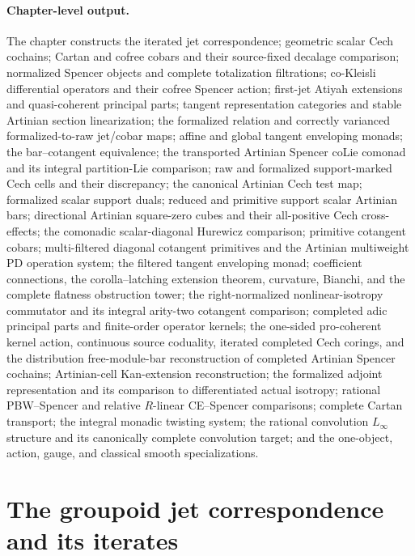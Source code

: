 \paragraph{Chapter-level output.}
The chapter constructs the iterated jet correspondence; geometric scalar
Cech cochains; Cartan and cofree cobars and their source-fixed decalage
comparison; normalized Spencer objects and complete totalization filtrations;
co-Kleisli differential operators and their cofree Spencer action; first-jet
Atiyah extensions and quasi-coherent principal parts; tangent representation
categories and stable Artinian section linearization; the formalized relation
and correctly varianced formalized-to-raw jet/cobar maps; affine and global
tangent enveloping monads; the bar--cotangent equivalence; the transported
Artinian Spencer coLie comonad and its integral partition-Lie comparison; raw
and formalized support-marked Cech cells and their discrepancy; the canonical
Artinian Cech test map; formalized scalar support duals; reduced and primitive
support scalar Artinian bars; directional Artinian square-zero cubes and their
all-positive Cech cross-effects; the comonadic scalar-diagonal Hurewicz
comparison; primitive cotangent cobars; multi-filtered diagonal cotangent
primitives and the Artinian multiweight PD operation system; the filtered tangent enveloping
monad; coefficient connections, the corolla--latching extension theorem,
curvature, Bianchi, and the complete flatness obstruction tower; the
right-normalized nonlinear-isotropy commutator and its integral arity-two
cotangent comparison; completed adic principal parts and finite-order operator
kernels; the one-sided pro-coherent kernel action, continuous source coduality,
iterated completed Cech corings, and the distribution free-module-bar
reconstruction of completed Artinian Spencer cochains; Artinian-cell
Kan-extension reconstruction; the formalized adjoint representation and its
comparison to differentiated actual isotropy; rational PBW--Spencer and
relative $R$-linear CE--Spencer comparisons; complete Cartan transport; the
integral monadic twisting system; the rational convolution $L_\infty$
structure and its canonically complete convolution target; and the one-object,
action, gauge, and classical smooth specializations.

\section{The groupoid jet correspondence and its iterates}
\label{sec:as-jet-correspondence}

